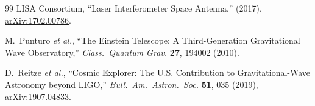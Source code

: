 \documentclass[12pt,a4paper,twocolumn]{article}
\begin{document}
\begin{thebibliography}{99}
LISA Consortium,
``Laser Interferometer Space Antenna,''
(2017),
\href{https://arxiv.org/abs/1702.00786}{arXiv:1702.00786}.

M.~Punturo \textit{et al.},
``The Einstein Telescope: A Third-Generation Gravitational Wave Observatory,''
\textit{Class.~Quantum Grav.} \textbf{27}, 194002 (2010).

D.~Reitze \textit{et al.},
``Cosmic Explorer: The U.S. Contribution to Gravitational-Wave Astronomy beyond LIGO,''
\textit{Bull.~Am.~Astron.~Soc.} \textbf{51}, 035 (2019),
\href{https://arxiv.org/abs/1907.04833}{arXiv:1907.04833}.

\end{thebibliography}
\end{document}
